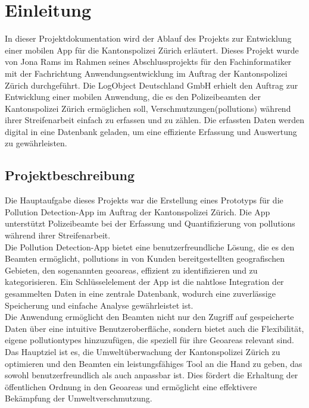 \documentclass[a4paper,12pt]{article}
\begin{document}
\lstlistoflistings
{}

\clearpage
{}
\printglossary[type=\acronymtype,title=Abkürzungsverzeichnis]

\clearpage
{}
\printglossary[type=main,title=Glossar]


\clearpage
{}
\section{Einleitung}
In dieser Projektdokumentation wird der Ablauf des Projekts zur Entwicklung einer mobilen App für die Kantonspolizei Zürich erläutert. Dieses Projekt wurde von Jona Rams im Rahmen seines Abschlussprojekts für den Fachinformatiker mit der Fachrichtung Anwendungsentwicklung im Auftrag der Kantonspolizei Zürich durchgeführt. Die LogObject Deutschland GmbH erhielt den Auftrag zur Entwicklung einer mobilen Anwendung, die es den Polizeibeamten der Kantonspolizei Zürich ermöglichen soll, Verschmutzungen(\glspl{pollution}) während ihrer Streifenarbeit einfach zu erfassen und zu zählen. Die erfassten Daten werden digital in eine Datenbank geladen, um eine effiziente Erfassung und Auswertung zu gewährleisten.

\subsection{Projektbeschreibung}
\label{sec:projektbeschreibung}
Die Hauptaufgabe dieses Projekts war die Erstellung eines Prototyps für die \glqq Pollution Detection\grqq{}-App im Auftrag der Kantonspolizei Zürich. Die App unterstützt Polizeibeamte bei der Erfassung und Quantifizierung von \glspl{pollution} während ihrer Streifenarbeit.\\
Die \glqq Pollution Detection\grqq{}-App bietet eine benutzerfreundliche Lösung, die es den Beamten ermöglicht, \glspl{pollution} in von Kunden bereitgestellten geografischen Gebieten, den sogenannten \glspl{geoarea}, effizient zu identifizieren und zu kategorisieren. Ein Schlüsselelement der App ist die nahtlose Integration der gesammelten Daten in eine zentrale Datenbank, wodurch eine zuverlässige Speicherung und einfache Analyse gewährleistet ist.\\
Die Anwendung ermöglicht den Beamten nicht nur den Zugriff auf gespeicherte Daten über eine intuitive Benutzeroberfläche, sondern bietet auch die Flexibilität, eigene \glspl{pollutiontype} hinzuzufügen, die speziell für ihre Geoareas relevant sind.\\
Das Hauptziel ist es, die Umweltüberwachung der Kantonspolizei Zürich zu optimieren und den Beamten ein leistungsfähiges Tool an die Hand zu geben, das sowohl benutzerfreundlich als auch anpassbar ist. Dies fördert die Erhaltung der öffentlichen Ordnung in den Geoareas und ermöglicht eine effektivere Bekämpfung der Umweltverschmutzung.
\end{document}
